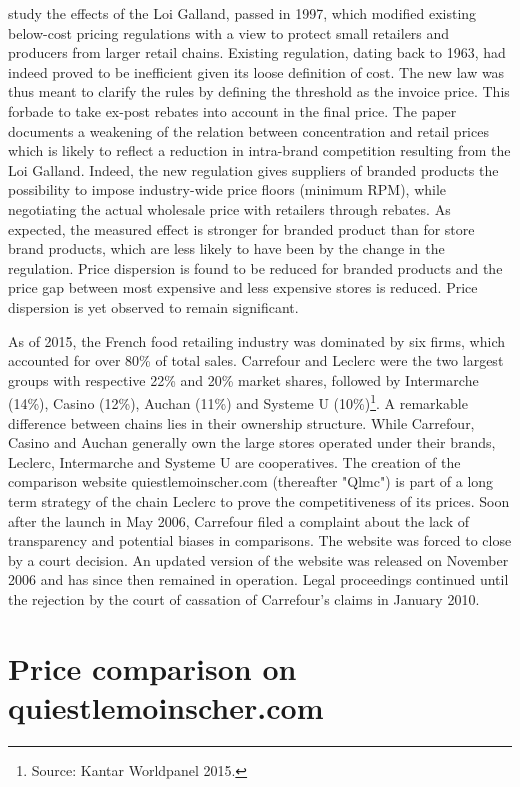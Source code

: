 \documentclass[english]{article}
\begin{document}
\cite{BIS13} study the effects of the Loi Galland, passed in 1997, which modified existing below-cost pricing regulations with a view to protect small retailers and producers from larger retail chains. Existing regulation, dating back to 1963, had indeed proved to be inefficient given its loose definition of cost. The new law was thus meant to clarify the rules by defining the threshold as the invoice price. This forbade to take ex-post rebates into account in the final price. The paper documents a weakening of the relation between concentration and retail prices which is likely to reflect a reduction in intra-brand competition resulting from the Loi Galland. Indeed, the new regulation gives suppliers of branded products the possibility to impose industry-wide price floors (minimum RPM), while negotiating the actual wholesale price with retailers through rebates. As expected, the measured effect is stronger for branded product than for store brand products, which are less likely to have been by the change in the regulation. Price dispersion is found to be reduced for branded products and the price gap between most expensive and less expensive stores is reduced. Price dispersion is yet observed to remain significant.

As of 2015, the French food retailing industry was dominated by six firms, which accounted for over 80\% of total sales. Carrefour and Leclerc were the two largest groups with respective 22\% and 20\% market shares, followed by Intermarche (14\%), Casino (12\%), Auchan (11\%) and Systeme U (10\%)\footnote{Source: Kantar Worldpanel 2015.}. A remarkable difference between chains lies in their ownership structure. While Carrefour, Casino and Auchan generally own the large stores operated under their brands, Leclerc, Intermarche and Systeme U are cooperatives. The creation of the comparison website quiestlemoinscher.com (thereafter "Qlmc") is part of a long term strategy of the chain Leclerc to prove the competitiveness of its prices. Soon after the launch in May 2006, Carrefour filed a complaint about the lack of transparency and potential biases in comparisons. The website was forced to close by a court decision. An updated version of the website was released on November 2006 and has since then remained in operation. Legal proceedings continued until the rejection by the court of cassation of Carrefour's claims in January 2010.

\section{Price comparison on quiestlemoinscher.com}
\end{document}
